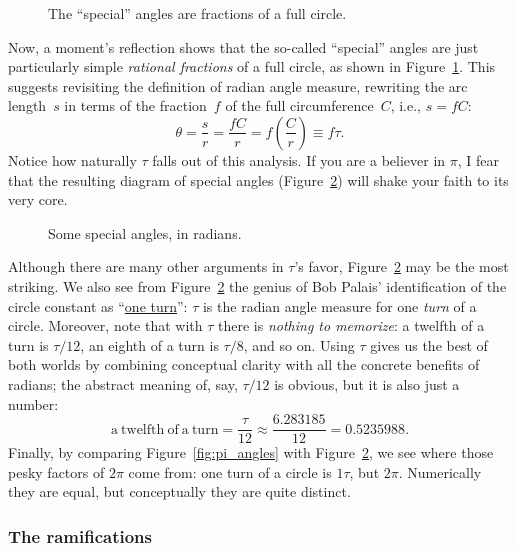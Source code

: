 \begin{figure}
\begin{center}
\end{center}
\caption{The ``special'' angles are fractions of a full circle.\label{fig:angle_fractions}}
\end{figure}

Now, a moment's reflection shows that the so-called ``special'' angles are just particularly simple \emph{rational fractions} of a full circle, as shown in Figure~\ref{fig:angle_fractions}. This suggests revisiting the definition of radian angle measure, rewriting the arc length~$s$ in terms of the fraction~$f$ of the full circumference~$C$, i.e., $s = f C$:
\[ \theta = \frac{s}{r} = \frac{fC}{r} =  f\left(\frac{C}{r}\right) \equiv f\tau. \]
 Notice how naturally $\tau$ falls out of this analysis. If you are a believer in $\pi$, I fear that the resulting diagram of special angles (Figure~\ref{fig:tau_angles}) will shake your faith to its very core.

\begin{figure}
\begin{center}
\end{center}
\caption{Some special angles, in radians.\label{fig:tau_angles}}
\end{figure}

Although there are many other arguments in $\tau$'s favor, Figure~\ref{fig:tau_angles} may be the most striking. We also see from Figure~\ref{fig:tau_angles} the genius of Bob Palais' identification of the circle constant as ``\href{http://en.wikipedia.org/wiki/Turn_(geometry)}{one turn}'': $\tau$ is the radian angle measure for one \emph{turn} of a circle. Moreover, note that with $\tau$ there is \emph{nothing to memorize}: a twelfth of a turn is $\tau/12$, an eighth of a turn is $\tau/8$, and so on. Using $\tau$ gives us the best of both worlds by combining conceptual clarity with all the concrete benefits of radians; the abstract meaning of, say, $\tau/12$ is obvious, but it is also just a number:
\[
  \mathrm{a\ twelfth\ of\ a\ turn} = \frac{\tau}{12} \approx \frac{6.283185}{12} = 0.5235988.
\]
Finally, by comparing Figure~\ref{fig:pi_angles} with Figure~\ref{fig:tau_angles}, we see where those pesky factors of $2\pi$ come from: one turn of a circle is $1\tau$, but $2\pi$. Numerically they are equal, but conceptually they are quite distinct.

    \subsubsection{The ramifications} %
    \label{sec:the_ramifications}

